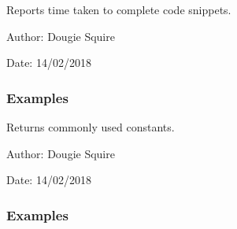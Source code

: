 \documentclass[letterpaper,10pt,english]{sphinxmanual}
\begin{document}
\begin{fulllineitems}
\label{\detokenize{utils_doc:utils.timer}}
Reports time taken to complete code snippets.

\begin{DUlineblock}{0em}
\item[] Author: Dougie Squire
\item[] Date: 14/02/2018
\end{DUlineblock}
\subsubsection*{Examples}

\begin{sphinxVerbatim}[commandchars=\\\{\}]
 
        
\end{sphinxVerbatim}

\end{fulllineitems}


\begin{fulllineitems}
\label{\detokenize{utils_doc:utils.constants}}
Returns commonly used constants.

\begin{DUlineblock}{0em}
\item[] Author: Dougie Squire
\item[] Date: 14/02/2018
\end{DUlineblock}
\subsubsection*{Examples}

\begin{sphinxVerbatim}[commandchars=\\\{\}]
  
\end{sphinxVerbatim}

\end{fulllineitems}
\end{document}
